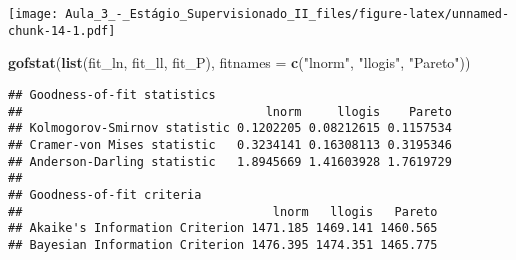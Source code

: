 \documentclass[]{article}
\newenvironment{Shaded}{\begin{snugshade}}{\end{snugshade}}
\newcommand{\DataTypeTok}[1]{\textcolor[rgb]{0.13,0.29,0.53}{#1}}
\newcommand{\KeywordTok}[1]{\textcolor[rgb]{0.13,0.29,0.53}{\textbf{#1}}}
\newcommand{\NormalTok}[1]{#1}
\newcommand{\StringTok}[1]{\textcolor[rgb]{0.31,0.60,0.02}{#1}}
\begin{document}
\texttt{[image: Aula\_3\_-\_Estágio\_Supervisionado\_II\_files/figure-latex/unnamed-chunk-14-1.pdf]}

\begin{Shaded}
\begin{Highlighting}[]
\KeywordTok{gofstat}\NormalTok{(}\KeywordTok{list}\NormalTok{(fit_ln, fit_ll, fit_P), }\DataTypeTok{fitnames =} \KeywordTok{c}\NormalTok{(}\StringTok{"lnorm"}\NormalTok{, }\StringTok{"llogis"}\NormalTok{, }\StringTok{"Pareto"}\NormalTok{))}
\end{Highlighting}
\end{Shaded}

\begin{verbatim}
## Goodness-of-fit statistics
##                                  lnorm     llogis    Pareto
## Kolmogorov-Smirnov statistic 0.1202205 0.08212615 0.1157534
## Cramer-von Mises statistic   0.3234141 0.16308113 0.3195346
## Anderson-Darling statistic   1.8945669 1.41603928 1.7619729
## 
## Goodness-of-fit criteria
##                                   lnorm   llogis   Pareto
## Akaike's Information Criterion 1471.185 1469.141 1460.565
## Bayesian Information Criterion 1476.395 1474.351 1465.775
\end{verbatim}
\end{document}
